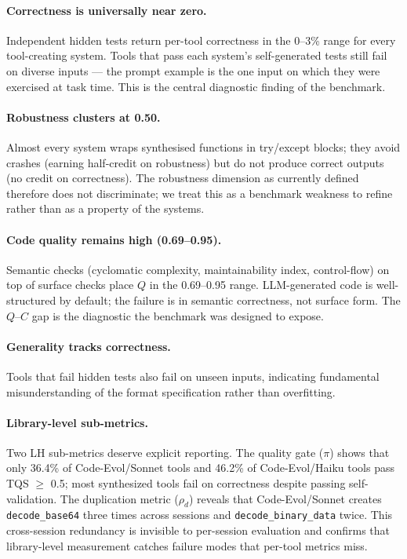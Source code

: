 \documentclass[sigconf,anonymous,review,natbib=false]{acmart}
\begin{document}
\paragraph{Correctness is universally near zero.} Independent hidden tests return per-tool correctness in the 0--3\% range for every tool-creating system. Tools that pass each system's self-generated tests still fail on diverse inputs --- the prompt example is the one input on which they were exercised at task time. This is the central diagnostic finding of the benchmark.

\paragraph{Robustness clusters at 0.50.} Almost every system wraps synthesised functions in try/except blocks; they avoid crashes (earning half-credit on robustness) but do not produce correct outputs (no credit on correctness). The robustness dimension as currently defined therefore does not discriminate; we treat this as a benchmark weakness to refine rather than as a property of the systems.

\paragraph{Code quality remains high (0.69--0.95).} Semantic checks (cyclomatic complexity, maintainability index, control-flow) on top of surface checks place $Q$ in the 0.69--0.95 range. LLM-generated code is well-structured by default; the failure is in semantic correctness, not surface form. The $Q$--$C$ gap is the diagnostic the benchmark was designed to expose.

\paragraph{Generality tracks correctness.} Tools that fail hidden tests also fail on unseen inputs, indicating fundamental misunderstanding of the format specification rather than overfitting.

\paragraph{Library-level sub-metrics.} Two LH sub-metrics deserve explicit reporting. The quality gate ($\pi$) shows that only 36.4\% of Code-Evol/Sonnet tools and 46.2\% of Code-Evol/Haiku tools pass TQS $\geq$ 0.5; most synthesized tools fail on correctness despite passing self-validation. The duplication metric ($\rho_d$) reveals that Code-Evol/Sonnet creates \texttt{decode\_base64} three times across sessions and \texttt{decode\_binary\_data} twice. This cross-session redundancy is invisible to per-session evaluation and confirms that library-level measurement catches failure modes that per-tool metrics miss.
\end{document}
